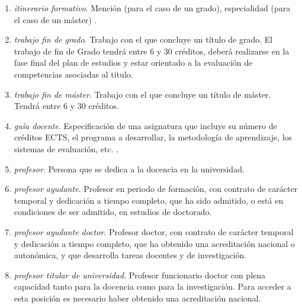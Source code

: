 \begin{enumerate}
    \item \emph{itinerario formativo}. Mención (para el caso de un grado),
        especialidad (para el caso de un máster) \cite[sección
        D.4]{guiaMadridMasD}\cite[artículo 9, apartado 3]{rd1393}.

    \item \emph{trabajo fin de grado}. Trabajo con el que concluye un título de
        grado\cite[artículo 12, apartado 3]{rd1393}. El trabajo de fin de Grado
        tendrá entre 6 y 30 créditos, deberá realizarse en la fase final del
        plan de estudios y estar orientado a la evaluación de competencias
        asociadas al título.\cite[artículo 12, apartado 7]{rd1393}

    \item \emph{trabajo fin de máster}. Trabajo con el que concluye un título
        de máster\cite[artículo 15, apartado 3]{rd1393}. Tendrá entre 6 y 30 créditos.

    \item \emph{guía docente}. Especificación de una asignatura que incluye su
        número de créditos ECTS, el programa a desarrollar, la metodología de
        aprendizaje, los sistemas de evaluación, etc. \cite[sección
        D.5]{guiaMadridMasD}.

    \item \emph{profesor}. Persona que se dedica a la docencia en la
        universidad.

    \item \emph{profesor ayudante}. Profesor en periodo de formación, con
        contrato de carácter temporal y dedicación a tiempo completo, que ha
        sido admitido, o está en condiciones de ser admitido, en estudios de
        doctorado\cite[artículo 49]{leyUniversidades}. 

    \item \emph{profesor ayudante doctor}. Profesor doctor, con contrato de
        carácter temporal y dedicación a tiempo completo, que ha obtenido una
        acreditación nacional o autonómica, y que desarrolla tareas docentes y de
        investigación\cite[artículo 50]{leyUniversidades}.  

    \item \emph{profesor titular de universidad}. Profesor funcionario doctor con plena
        capacidad tanto para la docencia como para la
        investigación. Para acceder a esta posición es necesario haber obtenido
        una acreditación nacional\cite{leyUniversidades}.


\end{enumerate}
